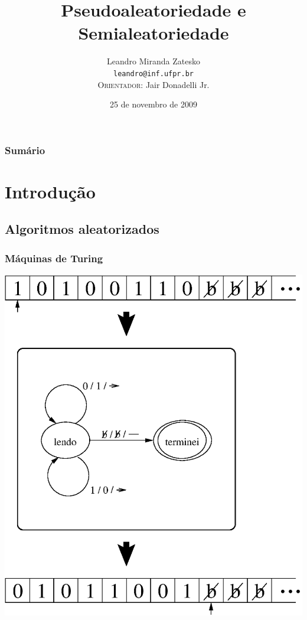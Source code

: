 \documentclass{beamer}
\title{Pseudoaleatoriedade e Semialeatoriedade}
\author[Leandro M. Zatesko]{Leandro Miranda Zatesko\\
  \texttt{leandro@inf.ufpr.br}\\
  {\tiny\scshape Orientador:} Jair Donadelli Jr.
}
\institute[ARG]%
{\textcolor{blue}{Grupo de Pesquisa em Algoritmos}}
\date[novembro de 2009]{25 de novembro de 2009}
\theoremstyle{teoaxicorlem}
\theoremstyle{defnotnom}
\begin{document}

\begin{frame}
  \titlepage
\end{frame}

\logo{}

\begin{frame}
  \frametitle{Sumário}
  \tableofcontents[hideallsubsections]
\end{frame}

\section{Introdução}

\subsection{Algoritmos aleatorizados}

\begin{frame}
  \frametitle{Máquinas de Turing}
  \begin{center}
    \noindent
    \includegraphics[height=.85\textheight]{turing.eps}
  \end{center}
\end{frame}
\end{document}
